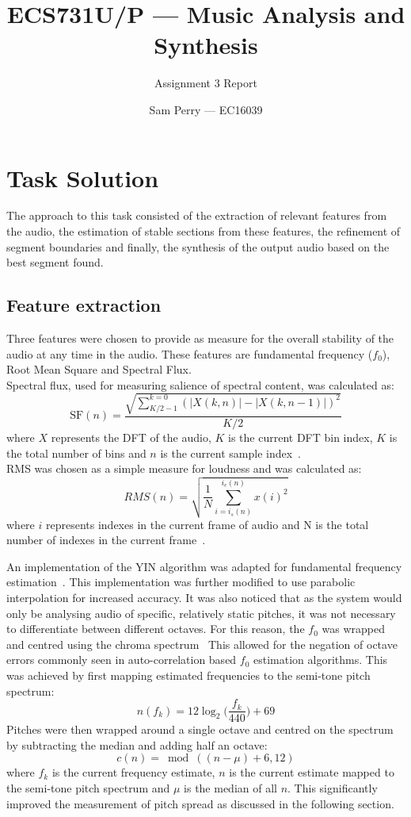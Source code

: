 \documentclass[titlepage]{scrartcl}
\begin{document}
\title{ECS731U/P --- Music Analysis and Synthesis}
\subtitle{\LARGE{Assignment 3 Report}}
\author{Sam Perry --- EC16039}

\maketitle

\section{Task Solution}
The approach to this task consisted of the extraction of relevant features from
the audio, the estimation of stable sections from these features, the
refinement of segment boundaries and finally, the synthesis of the output audio
based on the best segment found.

\subsection{Feature extraction}
Three features were chosen to provide as measure for the overall stability of
the audio at any time in the audio. These features are fundamental frequency
($f_0$), Root Mean Square and Spectral Flux.\\
Spectral flux, used for measuring salience of spectral content, was calculated as:
$$
\text{SF}(n) =
\frac{\sqrt{\sum_{K/2-1}^{k=0}(|X(k,n)|-|X(k,n-1)|)^2}}{K/2}
$$
where $X$ represents the DFT of the audio, $K$ is the current DFT bin index, $K$ is
the total number of bins and $n$ is the current sample
index~\parencite{Lerch2012}.\\
RMS was chosen as a simple measure for loudness and was calculated as:
$$RMS(n) = \sqrt{\frac{1}{N}\sum_{i=i_s(n)}^{i_e(n)}{x(i)^2}}$$
where $i$ represents indexes in the current frame of audio and N is the total
number of indexes in the current frame~\parencite{Lerch2012}.

An implementation of the YIN algorithm was adapted for fundamental frequency
estimation~\parencite[p352-353]{Zolzer2011}. This implementation was further
modified to use parabolic interpolation for increased accuracy.
It was also noticed that as the system would only be analysing audio of
specific, relatively static pitches, it was not necessary to differentiate
between different octaves. For this reason, the $f_0$ was wrapped and centred
using the chroma spectrum~\parencite[p.4]{Peeters2006} This allowed for the negation of octave errors
commonly seen in auto-correlation based $f_0$ estimation algorithms. This was
achieved by first mapping estimated frequencies to the semi-tone pitch
spectrum:
$$n(f_k) = 12\log_2\Big(\frac{f_k}{440}\Big)+69$$
Pitches were then wrapped around a single octave and centred on the spectrum by
subtracting the median and adding half an octave:
$$c(n) = \bmod((n-\mu)+6, 12)$$
where $f_k$ is the current frequency estimate, $n$ is the current estimate
mapped to the semi-tone pitch spectrum and $\mu$ is the median of all $n$.
This significantly improved the measurement of pitch spread  as discussed in
the following section.
\end{document}
